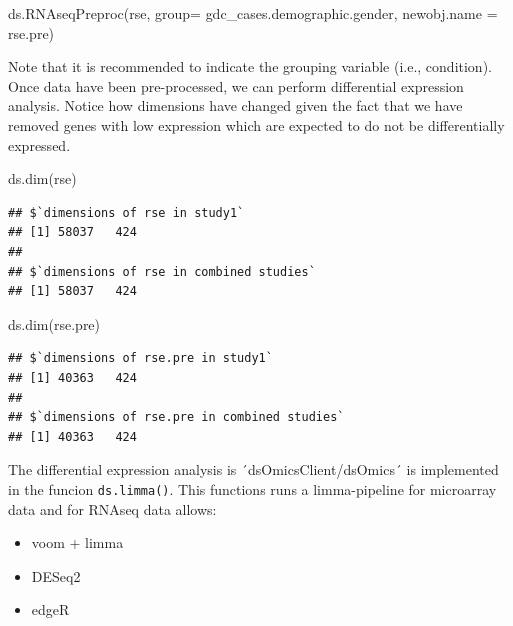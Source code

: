 \documentclass[
]{book}
\newenvironment{Shaded}{\begin{snugshade}}{\end{snugshade}}
\newcommand{\AttributeTok}[1]{\textcolor[rgb]{0.77,0.63,0.00}{#1}}
\newcommand{\FunctionTok}[1]{\textcolor[rgb]{0.00,0.00,0.00}{#1}}
\newcommand{\NormalTok}[1]{#1}
\newcommand{\StringTok}[1]{\textcolor[rgb]{0.31,0.60,0.02}{#1}}
\providecommand{\tightlist}{%
  \setlength{\itemsep}{0pt}\setlength{\parskip}{0pt}}
\begin{document}
\begin{Shaded}
\begin{Highlighting}[]
\FunctionTok{ds.RNAseqPreproc}\NormalTok{(}\StringTok{\textquotesingle{}rse\textquotesingle{}}\NormalTok{, }\AttributeTok{group=} \StringTok{\textquotesingle{}gdc\_cases.demographic.gender\textquotesingle{}}\NormalTok{, }
                 \AttributeTok{newobj.name =} \StringTok{\textquotesingle{}rse.pre\textquotesingle{}}\NormalTok{)}
\end{Highlighting}
\end{Shaded}

Note that it is recommended to indicate the grouping variable (i.e., condition). Once data have been pre-processed, we can perform differential expression analysis. Notice how dimensions have changed given the fact that we have removed genes with low expression which are expected to do not be differentially expressed.

\begin{Shaded}
\begin{Highlighting}[]
\FunctionTok{ds.dim}\NormalTok{(}\StringTok{\textquotesingle{}rse\textquotesingle{}}\NormalTok{)}
\end{Highlighting}
\end{Shaded}

\begin{verbatim}
## $`dimensions of rse in study1`
## [1] 58037   424
## 
## $`dimensions of rse in combined studies`
## [1] 58037   424
\end{verbatim}

\begin{Shaded}
\begin{Highlighting}[]
\FunctionTok{ds.dim}\NormalTok{(}\StringTok{\textquotesingle{}rse.pre\textquotesingle{}}\NormalTok{)}
\end{Highlighting}
\end{Shaded}

\begin{verbatim}
## $`dimensions of rse.pre in study1`
## [1] 40363   424
## 
## $`dimensions of rse.pre in combined studies`
## [1] 40363   424
\end{verbatim}

The differential expression analysis is ´dsOmicsClient/dsOmics´ is implemented in the funcion \texttt{ds.limma()}. This functions runs a limma-pipeline for microarray data and for RNAseq data allows:

\begin{itemize}
\tightlist
\item
  voom + limma
\item
  DESeq2
\item
  edgeR
\end{itemize}
\end{document}
